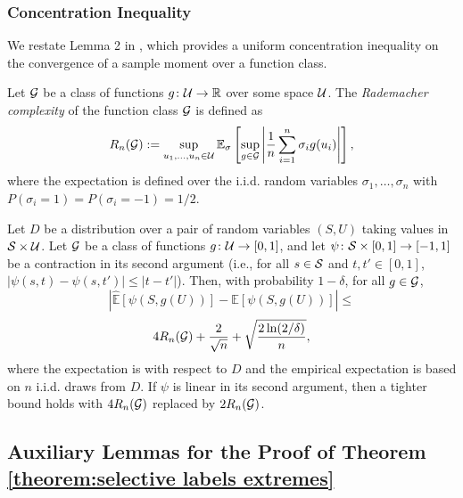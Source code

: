 \documentclass{article}
\begin{document}
\subsubsection{Concentration Inequality}
 We restate Lemma 2 in \cite{AgarwalEtAl(19)-FairRegression}, which provides a uniform concentration inequality on the convergence of a sample moment over a function class. 
 
 Let $\mathcal{G}$ be a class of functions $g \colon \mathcal{U} \rightarrow \mathbb{R}$ over some space $\mathcal{U}$. The \textit{Rademacher complexity} of the function class $\mathcal{G}$ is defined as 
    \[
    R_n(\mathcal{G}) := \sup_{u_1, \hdots, u_n \in \mathcal{U}} \mathbb{E}_{\sigma}\left[ \sup_{g \in \mathcal{G}} \left| \frac{1}{n} \sum_{i=1}^{n} \sigma_i g(u_i) \right| \right],
    \]
where the expectation is defined over the i.i.d. random variables $\sigma_1, \hdots, \sigma_n$ with $P(\sigma_i = 1) = P(\sigma_i = -1) = 1/2$. 

\begin{lemma}\label{lemma: lemma 2 in fair reg paper}
    Let $D$ be a distribution over a pair of random variables $(S, U)$ taking values in $\mathcal{S} \times \mathcal{U}$. Let $\mathcal{G}$ be a class of functions $g \colon \mathcal{U} \rightarrow [0, 1]$, and let $\psi \colon \mathcal{S} \times [0, 1] \rightarrow [-1, 1]$ be a contraction in its second argument (i.e., for all $s \in \mathcal{S}$ and $t, t' \in [0, 1]$, $|\psi(s, t) - \psi(s, t')| \leq |t - t'|$). Then, with probability $1 - \delta$, for all $g \in \mathcal{G}$,
    \[
    \left| \hat{\mathbb{E}}\left[ \psi(S, g(U)) \right] - \mathbb{E}\left[\psi(S, g(U)) \right]   \right| \leq
    \]
    \[
    4 R_n(\mathcal{G}) + \frac{2}{\sqrt{n}} + \sqrt{ \frac{2 \ln(2/\delta)}{n}  },
    \]
    where the expectation is with respect to $D$ and the empirical expectation is based on $n$ i.i.d. draws from $D$. If $\psi$ is linear in its second argument, then a tighter bound holds with $4 R_n(\mathcal{G})$ replaced by $2 R_n(\mathcal{G})$. 
\end{lemma}

\subsection{Auxiliary Lemmas for the Proof of Theorem \ref{theorem:selective labels extremes}}
\end{document}
